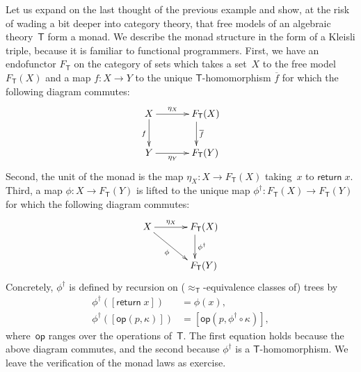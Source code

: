 \documentclass{amsart}
\newcommand{\theory}[1]{\mathsf{#1}} %
\newcommand{\Free}[2]{F_{\theory{#1}}(#2)} %
\newcommand{\FreeFun}[1]{F_{\theory{#1}}} %
\newcommand{\lift}[1]{#1^\dagger} %
\newcommand{\kode}[1]{\mathsf{#1}}
\newcommand{\opcall}[3]{\kode{#1}(#2, #3)}
\newcommand{\return}[1]{\kode{return}\;#1}
\begin{document}
Let us expand on the last thought of the previous example and show, at the risk
of wading a bit deeper into category theory, that free models of an algebraic
theory~$\theory{T}$ form a monad. We describe the monad structure in the form of
a Kleisli triple, because it is familiar to functional programmers. First, we
have an endofunctor $\FreeFun{T}$ on the category of sets which takes a set~$X$
to the free model $\Free{T}{X}$ and a map $f : X \to Y$ to the unique
$\theory{T}$-homomorphism $\overline{f}$ for which the following diagram
commutes:
%
\begin{equation*}
  \xymatrix{
    {X}
    \ar[r]^{\eta_X}
    \ar[d]_{f}
    &
    **[r]{\Free{T}{X}}
    \ar[d]^{\overline{f}}
    \\
    {Y}
    \ar[r]_{\eta_Y}
    &
    **[r]{\Free{T}{Y}}
  }
\end{equation*}
%
Second, the unit of the monad is the map $\eta_X : X \to \Free{T}{X}$ taking~$x$
to $\return{x}$. Third, a map $\phi : X \to \Free{T}{Y}$ is lifted to the unique
map $\lift{\phi} : \Free{T}{X} \to \Free{T}{Y}$ for which the following diagram
commutes:
%
\begin{equation*}
  \xymatrix{
    {X}
    \ar[r]^{\eta_X}
    \ar[rd]_{\phi}
    &
    **[r]{\Free{T}{X}}
    \ar[d]^{\lift{\phi}}
    \\
    &
    **[r]{\Free{T}{Y}}
  }
\end{equation*}
%
Concretely, $\lift{\phi}$ is defined by recursion on
($\approx_{\theory{T}}$-equivalence classes of) trees by
%
\begin{align*}
  \lift{\phi}([\return{x}]) &= \phi(x), \\
  \lift{\phi}([\opcall{op}{p}{\kappa}]) &= [\opcall{op}{p}{\lift{\phi} \circ \kappa}],
\end{align*}
%
where~$\kode{op}$ ranges over the operations of~$\theory{T}$. The first equation
holds because the above diagram commutes, and the second because $\lift{\phi}$ is a
$\theory{T}$-homomorphism. We leave the verification of the monad laws as
exercise.
\end{document}

